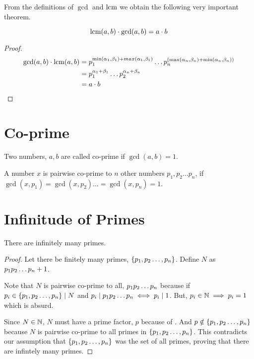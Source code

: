 From the definitions of \(\gcd\) and \(\operatorname*{lcm}\) we obtain the following very important theorem.

\begin{theorem}
	\[\operatorname*{lcm}(a,b)\cdot \gcd(a,b) = a\cdot b \]
\end{theorem}

\begin{proof}
	
	
	\begin{align*}
		\gcd(a,b) \cdot \operatorname*{lcm}(a,b) &= p_{1}^{\min(\alpha_1,\beta_1) + max(\alpha_1,\beta_1)} \ldots p_{n}^{(\max(\alpha_n, \beta_n) + \min(\alpha_n, \beta_n))}\\
		&= p_{1}^{\alpha_1 + \beta_1} \ldots p_2^{\alpha_n + \beta_n}\\
		&= a\cdot b
	\end{align*}	
	
	
\end{proof}



\section{Co-prime}

\begin{definition}
	Two numbers, \(a, b\) are called co-prime if \(\gcd(a,b)=1\).
\end{definition}

\begin{definition}
	A number \(x\) is pairwise co-prime to \(n\) other numbers \(p_{1}, p_{2} \ldots p_{n}\), if \( \gcd(x, p_1) = \gcd(x, p_2) \ldots = \gcd(x, p_n) =1 \).
\end{definition}

\section{Infinitude of Primes}



\begin{theorem}
	[Euclid]
	There are infinitely many primes.
\end{theorem}

\begin{proof}
	Let there be finitely many primes, \(\{p_{1},p_{2}\ldots,p_{n}\}\). Define \( N \) as \( p_{1}p_{2}\ldots p_{n} + 1 \).
	\par
	Note that \(N\) is pairwise co-prime to all, \(p_{1}p_{2}\ldots p_{n}\) because if \(p_i \in \{p_{1},p_{2}\ldots,p_{n}\} \mid N \) and \(p_i \mid p_{1}p_{2}\ldots p_{n} \iff p_i \mid 1\). But, \( p_i \in \mathbb N \implies p_i = 1 \) which is absurd.
	\\
	\par Since \(N \in \mathbb N\), \(N\) must have a prime factor, \(p\) because of . And \(p \notin \{p_{1},p_{2}\ldots,p_{n}\}\) because \(N \) is pairwise co-prime to all primes in \(\{p_{1},p_{2}\ldots,p_{n}\}\). This contradicts our assumption that \(\{p_{1},p_{2}\ldots,p_{n}\}\) was the set of all primes, proving that there are infintely many primes.
	


\end{proof}







